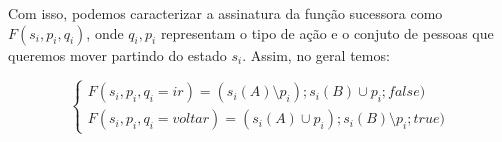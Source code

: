 \documentclass{article}
\begin{document}
Com isso, podemos caracterizar a assinatura da função sucessora como
$F(s_i, p_i, q_i)$, onde $q_i, p_i$ representam o tipo de ação e o conjuto
de pessoas que queremos mover partindo do estado $s_i$.
Assim, no geral temos:

\begin{equation}
\begin{cases}

F(s_i, p_i, q_i=ir) = (s_i(A) \setminus p_i); s_i(B) \cup p_i; false)
\\
F(s_i, p_i, q_i=voltar) = (s_i(A) \cup p_i); s_i(B) \setminus p_i; true)

\end{cases}
\end{equation}

\printbibliography
\end{document}
